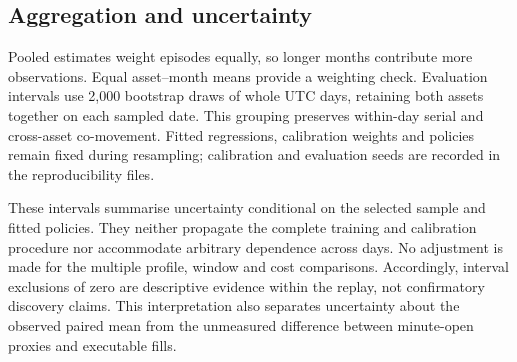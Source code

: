 \subsection{Aggregation and uncertainty}
\label{sec:uncertainty}
Pooled estimates weight episodes equally, so longer months contribute more observations. Equal asset--month means provide a weighting check. Evaluation intervals use 2,000 bootstrap draws of whole UTC days, retaining both assets together on each sampled date. This grouping preserves within-day serial and cross-asset co-movement. Fitted regressions, calibration weights and policies remain fixed during resampling; calibration and evaluation seeds are recorded in the reproducibility files.

These intervals summarise uncertainty conditional on the selected sample and fitted policies. They neither propagate the complete training and calibration procedure nor accommodate arbitrary dependence across days. No adjustment is made for the multiple profile, window and cost comparisons. Accordingly, interval exclusions of zero are descriptive evidence within the replay, not confirmatory discovery claims. This interpretation also separates uncertainty about the observed paired mean from the unmeasured difference between minute-open proxies and executable fills.

